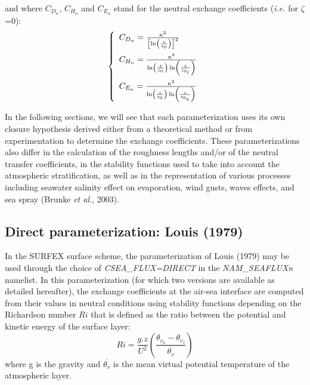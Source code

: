 and where $C_{D_n}$, $C_{H_n}$ and $C_{E_n}$ stand for the neutral exchange coefficients (\textit{i.e.} for $\zeta$=0):
\begin{equation}
\left\{
\begin{array}{l}
\vspace*{0.2 cm}
	C_{D_n}=\frac{{\kappa}^{2}}{\left[\ln\left(\frac{z}{z_0}\right)\right]^{2}}\\
\vspace*{0.2 cm}
	C_{H_n}=\frac{\kappa^{2}}{\ln\left(\frac{z}{z_0}\right)\ln\left(\frac{z}{z_{0_t}}\right)}\\
	C_{E_n}=\frac{\kappa^{2}}{\ln\left(\frac{z}{z_0}\right)\ln\left(\frac{z}{z_{0_q}}\right)}\\
\end{array}
\right.
\label{neutralcoef}\end{equation}

In the following sections, we will see that each parameterization uses its own closure hypothesis derived 
either from a theoretical method or from experimentation to determine the exchange coefficients.
These parameterizations also differ in the calculation of the roughness lengths and/or of the neutral transfer 
coefficients, in the stability functions used to take into account the atmospheric stratification, as well 
as in the representation of various processes including seawater salinity effect on evaporation, wind gusts,
waves effects, and sea spray (Brunke \textit{et al.}, 2003)\nocite{brunke2003}. 

\subsection{Direct parameterization: Louis (1979)\label{sct_Louis79}}

In the SURFEX surface scheme, the parameterization of Louis (1979) may be used through the choice of
\textit{CSEA\_FLUX=\textquotesingle{}DIRECT\textquotesingle{}} in the \textit{NAM\_SEAFLUXn} namelist.
In this parameterization (for which two versions are available as detailed hereafter), the exchange coefficients at the air-sea interface 
are computed from their values in neutral conditions using stability functions depending on the Richardson number $Ri$
that is defined as the ratio between the potential and kinetic energy of the surface layer: 
\begin{equation}
	Ri=\frac{g.z}{U^2}\left(\frac{\theta_{v_a}-\theta_{v_s}}{\overline{\theta_v}}\right)
\label{eq_ri}\end{equation}
where g is the gravity and $\overline{\theta_v}$ is the mean virtual potential temperature of the atmospheric layer.

